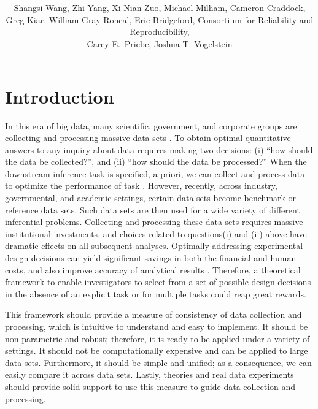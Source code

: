 \documentclass{article}
\title{\vspace{-50pt}
\db{Optimal Decisions for Discovery Science via Maximizing Discriminability: \\ Applications in Neuroimaging}
}
\author{Shangsi Wang, Zhi Yang, Xi-Nian Zuo, Michael Milham, Cameron Craddock,  \\ 
Greg Kiar, William Gray Roncal, Eric Bridgeford,
Consortium for Reliability and Reproducibility, \\ Carey E.~Priebe, Joshua T. Vogelstein}
\begin{document}
\maketitle
\tableofcontents
\newpage
\linenumbers

\section{Introduction}

In this era of big data, many scientific, government, and corporate groups are collecting and processing massive data sets \cite{manyika2011big,wu2014data}. To obtain optimal quantitative answers to any inquiry about data requires making two decisions: (i) “how should the data be collected?”, and (ii) “how should the data be processed?”  When the downstream inference task is specified, a priori, we can collect and process data to optimize the performance of task \cite{kohavi1995study,reiter2011mprophet}. However, recently, across industry, governmental, and academic settings, certain data sets become benchmark or reference data sets. Such data sets are then used for a wide variety of different inferential problems. Collecting and processing these data sets requires massive institutional investments, and choices related to questions(i) and (ii) above have dramatic effects on all subsequent analyses. Optimally addressing experimental design decisions can yield significant savings in both the financial and human costs, and also improve accuracy of analytical results \cite{ballou1985modeling,dale1999optimal,banga2008parameter}. Therefore, a theoretical framework to enable investigators to select from a set of possible design decisions in the absence of an explicit task or for multiple tasks could reap great rewards.

This framework should provide a measure of consistency of data collection and processing, which is intuitive to understand and easy to implement. It should be non-parametric and robust; therefore, it is ready to be applied under a variety of settings. It should not be computationally expensive and can be applied to large data sets. Furthermore, it should be simple and unified; as a consequence, we can easily compare it across data sets. Lastly, theories and real data experiments should provide solid support to use this measure to guide data collection and processing. 
 
\end{document}

